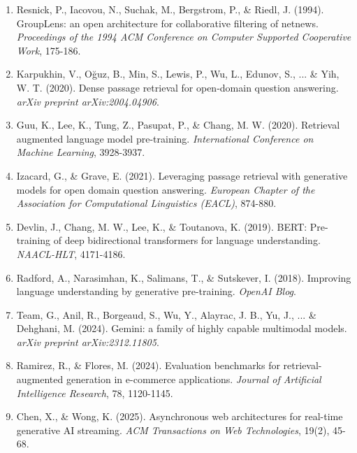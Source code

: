 \documentclass[12pt,a4paper]{article}
\begin{document}
\begin{enumerate}[leftmargin=2em, itemsep=8pt]
    \item Resnick, P., Iacovou, N., Suchak, M., Bergstrom, P., \& Riedl, J. (1994). GroupLens: an open architecture for collaborative filtering of netnews. \textit{Proceedings of the 1994 ACM Conference on Computer Supported Cooperative Work}, 175-186.
    \item Karpukhin, V., Oğuz, B., Min, S., Lewis, P., Wu, L., Edunov, S., ... \& Yih, W. T. (2020). Dense passage retrieval for open-domain question answering. \textit{arXiv preprint arXiv:2004.04906}.
    \item Guu, K., Lee, K., Tung, Z., Pasupat, P., \& Chang, M. W. (2020). Retrieval augmented language model pre-training. \textit{International Conference on Machine Learning}, 3928-3937.
    \item Izacard, G., \& Grave, E. (2021). Leveraging passage retrieval with generative models for open domain question answering. \textit{European Chapter of the Association for Computational Linguistics (EACL)}, 874-880.
    \item Devlin, J., Chang, M. W., Lee, K., \& Toutanova, K. (2019). BERT: Pre-training of deep bidirectional transformers for language understanding. \textit{NAACL-HLT}, 4171-4186.
    \item Radford, A., Narasimhan, K., Salimans, T., \& Sutskever, I. (2018). Improving language understanding by generative pre-training. \textit{OpenAI Blog}.
    \item Team, G., Anil, R., Borgeaud, S., Wu, Y., Alayrac, J. B., Yu, J., ... \& Dehghani, M. (2024). Gemini: a family of highly capable multimodal models. \textit{arXiv preprint arXiv:2312.11805}.
    \item Ramirez, R., \& Flores, M. (2024). Evaluation benchmarks for retrieval-augmented generation in e-commerce applications. \textit{Journal of Artificial Intelligence Research}, 78, 1120-1145.
    \item Chen, X., \& Wong, K. (2025). Asynchronous web architectures for real-time generative AI streaming. \textit{ACM Transactions on Web Technologies}, 19(2), 45-68.
\end{enumerate}
\end{document}
